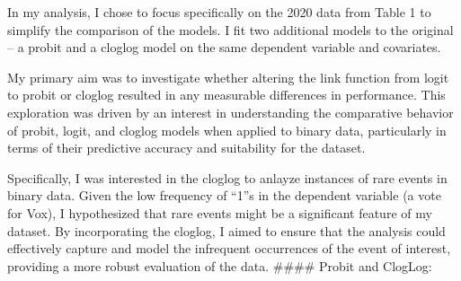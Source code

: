 \documentclass[
  letterpaper,
  DIV=11,
  numbers=noendperiod]{scrartcl}
\begin{document}
In my analysis, I chose to focus specifically on the 2020 data from
Table 1 to simplify the comparison of the models. I fit two additional
models to the original -- a probit and a cloglog model on the same
dependent variable and covariates.

My primary aim was to investigate whether altering the link function
from logit to probit or cloglog resulted in any measurable differences
in performance. This exploration was driven by an interest in
understanding the comparative behavior of probit, logit, and cloglog
models when applied to binary data, particularly in terms of their
predictive accuracy and suitability for the dataset.

Specifically, I was interested in the cloglog to anlayze instances of
rare events in binary data. Given the low frequency of ``1''s in the
dependent variable (a vote for Vox), I hypothesized that rare events
might be a significant feature of my dataset. By incorporating the
cloglog, I aimed to ensure that the analysis could effectively capture
and model the infrequent occurrences of the event of interest, providing
a more robust evaluation of the data. \#\#\#\# Probit and ClogLog:
\end{document}
